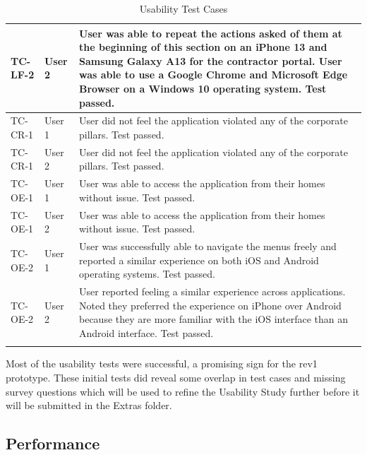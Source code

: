 \documentclass[12pt, titlepage]{article}
\begin{document}
\begin{longtable}{|m{2cm}|m{1.5cm}|m{9cm}|}
  \hline
  TC-LF-2 & User 2& User was able to repeat the actions asked of them
  at the beginning of this section on an iPhone 13 and Samsung Galaxy A13
  for the contractor portal. User was able to use a Google Chrome and
  Microsoft Edge Browser on a Windows 10 operating system. Test passed.\\
  \hline
  TC-CR-1 & User 1& User did not feel the application violated any of
  the corporate pillars. Test passed.\\
  \hline
  TC-CR-1 & User 2& User did not feel the application violated any of
  the corporate pillars. Test passed.\\
  \hline
  TC-OE-1 & User 1 & User was able to access the application from
  their homes without issue. Test passed.\\
  \hline
  TC-OE-1 & User 2& User was able to access the application from
  their homes without issue. Test passed.\\
  \hline
  TC-OE-2 & User 1& User was successfully able to navigate the menus
  freely and reported a similar experience on both iOS
  and Android operating systems. Test passed.\\
  \hline
  TC-OE-2 & User 2& User reported feeling a similar experience across
  applications. Noted they preferred the experience on
  iPhone over Android because they are more familiar with the iOS
  interface than an Android interface. Test passed.\\
  \hline
  \caption{Usability Test Cases}
\end{longtable}
Most of the usability tests were successful, a promising sign for the
rev1 prototype. These initial tests did reveal some overlap in test cases
and missing survey questions which will be used to refine the
Usability Study further before it will be submitted in the Extras folder.

\subsection{Performance}
\end{document}
